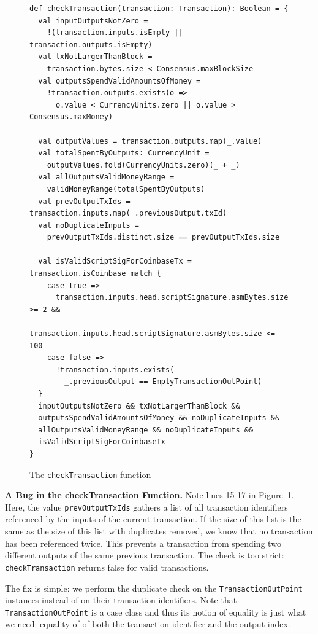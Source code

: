 \documentclass[hyphens, a4paper,USenglish,cleveref, autoref, thm-restate]{oasics-v2019}
\renewcommand{\paragraph}{\textbf}%
\begin{document}
\begin{figure}
\begin{lstlisting}[style=scala]
def checkTransaction(transaction: Transaction): Boolean = {
  val inputOutputsNotZero =
    !(transaction.inputs.isEmpty || transaction.outputs.isEmpty)
  val txNotLargerThanBlock = 
    transaction.bytes.size < Consensus.maxBlockSize
  val outputsSpendValidAmountsOfMoney = 
    !transaction.outputs.exists(o =>
      o.value < CurrencyUnits.zero || o.value > Consensus.maxMoney)

  val outputValues = transaction.outputs.map(_.value)
  val totalSpentByOutputs: CurrencyUnit =
    outputValues.fold(CurrencyUnits.zero)(_ + _)
  val allOutputsValidMoneyRange = 
    validMoneyRange(totalSpentByOutputs)
  val prevOutputTxIds = transaction.inputs.map(_.previousOutput.txId)
  val noDuplicateInputs = 
    prevOutputTxIds.distinct.size == prevOutputTxIds.size

  val isValidScriptSigForCoinbaseTx = transaction.isCoinbase match {
    case true =>
      transaction.inputs.head.scriptSignature.asmBytes.size >= 2 &&
        transaction.inputs.head.scriptSignature.asmBytes.size <= 100
    case false =>
      !transaction.inputs.exists(
        _.previousOutput == EmptyTransactionOutPoint)
  }
  inputOutputsNotZero && txNotLargerThanBlock && 
  outputsSpendValidAmountsOfMoney && noDuplicateInputs &&
  allOutputsValidMoneyRange && noDuplicateInputs && 
  isValidScriptSigForCoinbaseTx
}
\end{lstlisting}
  
  \caption{The \texttt{checkTransaction} function}
  \label{fig:checktrans}
\end{figure}


\paragraph{A Bug in the checkTransaction Function.} Note lines 15-17
in Figure~\ref{fig:checktrans}. Here, the value
\texttt{prevOutputTxIds} gathers a list of all transaction identifiers
referenced by the inputs of the current transaction. If the size of
this list is the same as the size of this list with duplicates
removed, we know that no transaction has been referenced twice. This
prevents a transaction from spending two different outputs of the same
previous transaction. The check is too strict:
\texttt{checkTransaction} returns false for valid transactions.

The fix is simple: we perform the duplicate check on the
\texttt{TransactionOutPoint} instances instead of on their transaction
identifiers. Note that \texttt{TransactionOutPoint} is a case class
and thus its notion of equality is just what we need: equality of of
both the transaction identifier and the output index.
\end{document}
